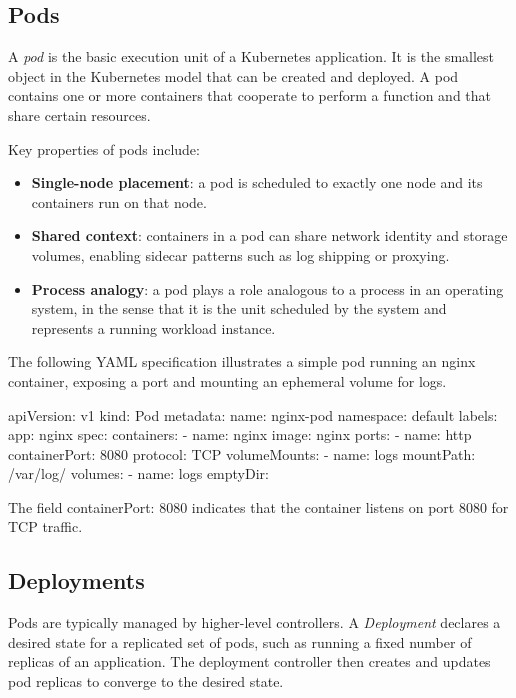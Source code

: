 \documentclass[11pt,a4paper,openany]{report}
\begin{document}
\subsection{Pods}

A \emph{pod} is the basic execution unit of a Kubernetes application. It is the smallest object in the Kubernetes model that can be created and deployed. A pod contains one or more containers that cooperate to perform a function and that share certain resources.

Key properties of pods include:

\begin{itemize}
\item \textbf{Single-node placement}: a pod is scheduled to exactly one node and its containers run on that node.
\item \textbf{Shared context}: containers in a pod can share network identity and storage volumes, enabling sidecar patterns such as log shipping or proxying.
\item \textbf{Process analogy}: a pod plays a role analogous to a process in an operating system, in the sense that it is the unit scheduled by the system and represents a running workload instance.
\end{itemize}

The following YAML specification illustrates a simple pod running an nginx container, exposing a port and mounting an ephemeral volume for logs.

\begin{codeblock}
apiVersion: v1
kind: Pod
metadata:
  name: nginx-pod
  namespace: default
  labels:
    app: nginx
spec:
  containers:
    - name: nginx
      image: nginx
      ports:
        - name: http
          containerPort: 8080
          protocol: TCP
      volumeMounts:
        - name: logs
          mountPath: /var/log/
  volumes:
    - name: logs
      emptyDir: {}
\end{codeblock}

The field containerPort: 8080 indicates that the container listens on port 8080 for TCP traffic.

\subsection{Deployments}

Pods are typically managed by higher-level controllers. A \emph{Deployment} declares a desired state for a replicated set of pods, such as running a fixed number of replicas of an application. The deployment controller then creates and updates pod replicas to converge to the desired state.
\end{document}
